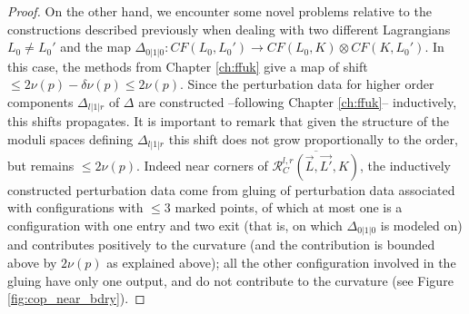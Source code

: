 \begin{proof}
On the other hand, we encounter some novel problems relative to the constructions described previously when dealing with two different Lagrangians $L_0\neq L_0' $ and the map $ \Delta_{0|1|0}\colon CF(L_0,L_0')\to CF(L_0,K)\otimes CF(K,L_0')$. In this case, the methods from Chapter \ref{ch:ffuk} give a map of shift $\leq 2\nu(p)-\delta\nu(p)\leq 2\nu(p)$. Since the perturbation data for higher order components $\Delta_{l|1|r}$ of $\Delta$ are constructed --following Chapter \ref{ch:ffuk}-- inductively, this shifts propagates. It is important to remark that given the structure of the moduli spaces defining $\Delta_{l|1|r}$ this shift does not grow proportionally to the order, but remains $\leq 2\nu(p)$. Indeed near corners of $\overline{\mathcal{R}_C^{l,r}(\vec{L},\vec{L'},K)}$, the inductively constructed perturbation data come from gluing of perturbation data associated with configurations with $\leq 3$ marked points, of which at most one is a configuration with one entry and two exit (that is, on which $\Delta_{0|1|0}$ is modeled on) and contributes positively to the curvature (and the contribution is bounded above by $2\nu(p)$ as explained above); all the other configuration involved in the gluing have only one output, and do not contribute to the curvature (see Figure \ref{fig:cop_near_bdry}).
% 
% 

\end{proof}
